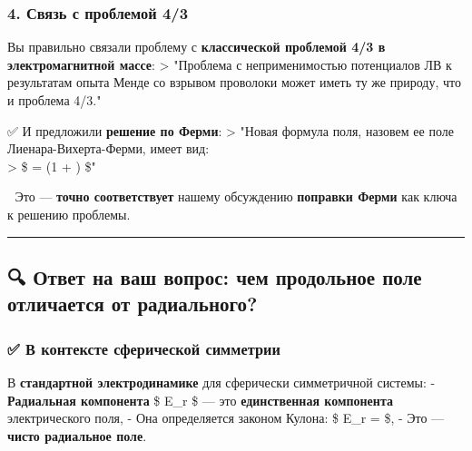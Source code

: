 \documentclass[11pt]{article}
\begin{document}
\subsubsection{4. Связь с проблемой
4/3}\label{ux441ux432ux44fux437ux44c-ux441-ux43fux440ux43eux431ux43bux435ux43cux43eux439-43}

Вы правильно связали проблему с \textbf{классической проблемой 4/3 в
электромагнитной массе}: \textgreater{} "Проблема с неприменимостью
потенциалов ЛВ к результатам опыта Менде со взрывом проволоки может
иметь ту же природу, что и проблема 4/3."

✅ И предложили \textbf{решение по Ферми}: \textgreater{} "Новая формула
поля, назовем ее поле Лиенара-Вихерта-Ферми, имеет вид:\\
\textgreater{} \$  = 
 \left(1
+ \right) \$"

📌 Это --- \textbf{точно соответствует} нашему обсуждению
\textbf{поправки Ферми} как ключа к решению проблемы.

\begin{center}\rule{0.5\linewidth}{\linethickness}\end{center}

\subsection{🔍 Ответ на ваш вопрос: чем продольное поле отличается от
радиального?}\label{ux43eux442ux432ux435ux442-ux43dux430-ux432ux430ux448-ux432ux43eux43fux440ux43eux441-ux447ux435ux43c-ux43fux440ux43eux434ux43eux43bux44cux43dux43eux435-ux43fux43eux43bux435-ux43eux442ux43bux438ux447ux430ux435ux442ux441ux44f-ux43eux442-ux440ux430ux434ux438ux430ux43bux44cux43dux43eux433ux43e}

\subsubsection{✅ В контексте сферической
симметрии}\label{ux432-ux43aux43eux43dux442ux435ux43aux441ux442ux435-ux441ux444ux435ux440ux438ux447ux435ux441ux43aux43eux439-ux441ux438ux43cux43cux435ux442ux440ux438ux438}

В \textbf{стандартной электродинамике} для сферически симметричной
системы: - \textbf{Радиальная компонента} \$ E\_r \$ --- это
\textbf{единственная компонента} электрического поля, - Она определяется
законом Кулона: \$ E\_r =  \$, - Это --- \textbf{чисто
радиальное поле}.
\end{document}
